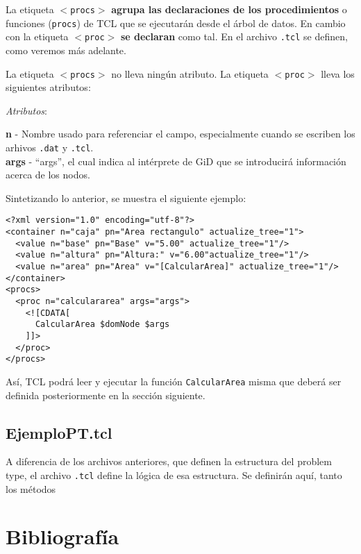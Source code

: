\documentclass[10pt, a4paper, twocolumn]{article} %
\begin{document}
La etiqueta \texttt{$<$procs$>$} \textbf{agrupa las declaraciones de los procedimientos} o funciones (\texttt{procs}) de TCL que se ejecutarán desde el árbol de datos. En cambio con la etiqueta \texttt{$<$proc$>$} \textbf{se declaran} como tal. En el archivo \texttt{.tcl} se definen, como veremos más adelante.

La etiqueta \texttt{$<$procs$>$} no lleva ningún atributo. La etiqueta \texttt{$<$proc$>$} lleva los siguientes atributos:

\vspace{0.15cm}
\textit{Atributos}:

\vspace{0.15cm}
	\textbf{n} - Nombre usado para referenciar el campo, especialmente cuando se escriben los arhivos \texttt{.dat} y \texttt{.tcl}.\\
	\textbf{args} - ``args'', el cual indica al intérprete de GiD que se introducirá información acerca de los nodos.\\
\vspace{0.15cm}

Sintetizando lo anterior, se muestra el siguiente ejemplo:

\lstset{language=XML} 
\begin{lstlisting}
<?xml version="1.0" encoding="utf-8"?>
<container n="caja" pn="Area rectangulo" actualize_tree="1">
  <value n="base" pn="Base" v="5.00" actualize_tree="1"/>
  <value n="altura" pn="Altura:" v="6.00"actualize_tree="1"/>
  <value n="area" pn="Area" v="[CalcularArea]" actualize_tree="1"/>
</container>
<procs>
  <proc n="calculararea" args="args">
    <![CDATA[
      CalcularArea $domNode $args
    ]]>
  </proc>
</procs>
\end{lstlisting}

Así, TCL podrá leer y ejecutar la función \texttt{CalcularArea} misma que deberá ser definida posteriormente en la sección siguiente.


\subsection{EjemploPT.tcl}

A diferencia de los archivos anteriores, que definen la estructura del problem type, el archivo \texttt{.tcl} define la lógica de esa estructura. Se definirán aquí, tanto los métodos 



\section{Bibliografía}


\end{document}
